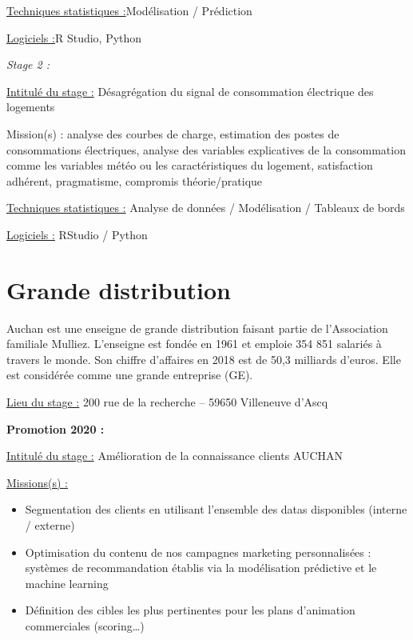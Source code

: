 \documentclass[
  letterpaper,
  DIV=11,
  numbers=noendperiod]{scrreprt}
\begin{document}
\uline{Techniques statistiques :}Modélisation / Prédiction

\uline{Logiciels :}R Studio, Python

\emph{Stage 2 :}

\uline{Intitulé du stage :} Désagrégation du signal de consommation
électrique des logements

Mission(s) : analyse des courbes de charge, estimation des postes de
consommations électriques, analyse des variables explicatives de la
consommation comme les variables météo ou les caractéristiques du
logement, satisfaction adhérent, pragmatisme, compromis théorie/pratique

\uline{Techniques statistiques :} Analyse de données / Modélisation /
Tableaux de bords

\uline{Logiciels :} RStudio / Python


\hypertarget{grande-distribution}{%
\chapter{Grande distribution}\label{grande-distribution}}

Auchan est une enseigne de grande distribution faisant partie de
l'Association familiale Mulliez. L'enseigne est fondée en 1961 et
emploie 354 851 salariés à travers le monde. Son chiffre d'affaires en
2018 est de 50,3 milliards d'euros. Elle est considérée comme une grande
entreprise (GE).

\uline{Lieu du stage :} 200 rue de la recherche -- 59650 Villeneuve
d'Ascq

\textbf{Promotion 2020 :}

\uline{Intitulé du stage :} Amélioration de la connaissance clients
AUCHAN

\uline{Missions(s) :}

\begin{itemize}
\item
  Segmentation des clients en utilisant l'ensemble des datas disponibles
  (interne / externe)
\item
  Optimisation du contenu de nos campagnes marketing personnalisées :
  systèmes de recommandation établis via la modélisation prédictive et
  le machine learning
\item
  Définition des cibles les plus pertinentes pour les plans d'animation
  commerciales (scoring\ldots)
\end{itemize}
\end{document}
